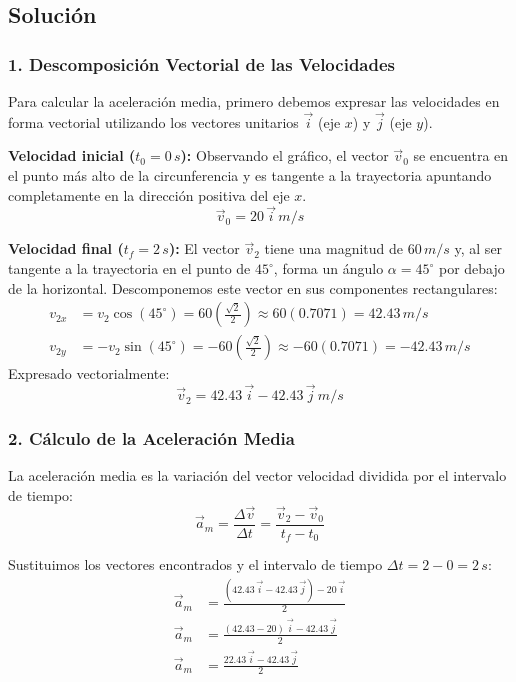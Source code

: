 \documentclass[12pt, a4paper]{article}
\begin{document}
\subsection*{Solución}

\subsubsection*{1. Descomposición Vectorial de las Velocidades}
Para calcular la aceleración media, primero debemos expresar las velocidades en forma vectorial utilizando los vectores unitarios $\vec{i}$ (eje $x$) y $\vec{j}$ (eje $y$).

\textbf{Velocidad inicial ($t_0 = 0 \, \si{s}$):}
Observando el gráfico, el vector $\vec{v}_0$ se encuentra en el punto más alto de la circunferencia y es tangente a la trayectoria apuntando completamente en la dirección positiva del eje $x$.
$$\vec{v}_0 = 20 \, \vec{i} \, \si{m/s}$$

\textbf{Velocidad final ($t_f = 2 \, \si{s}$):}
El vector $\vec{v}_2$ tiene una magnitud de $60 \, \si{m/s}$ y, al ser tangente a la trayectoria en el punto de $45^\circ$, forma un ángulo $\alpha = 45^\circ$ por debajo de la horizontal. Descomponemos este vector en sus componentes rectangulares:
\begin{align*}
    v_{2x} &= v_2 \cos(45^\circ) = 60 \left(\frac{\sqrt{2}}{2}\right) \approx 60 (0.7071) = 42.43 \, \si{m/s} \\
    v_{2y} &= -v_2 \sin(45^\circ) = -60 \left(\frac{\sqrt{2}}{2}\right) \approx -60 (0.7071) = -42.43 \, \si{m/s}
\end{align*}
Expresado vectorialmente:
$$\vec{v}_2 = 42.43 \, \vec{i} - 42.43 \, \vec{j} \, \si{m/s}$$

\subsubsection*{2. Cálculo de la Aceleración Media}
La aceleración media es la variación del vector velocidad dividida por el intervalo de tiempo:
$$\vec{a}_m = \frac{\Delta \vec{v}}{\Delta t} = \frac{\vec{v}_2 - \vec{v}_0}{t_f - t_0}$$

Sustituimos los vectores encontrados y el intervalo de tiempo $\Delta t = 2 - 0 = 2 \, \si{s}$:
\begin{align*}
    \vec{a}_m &= \frac{(42.43 \, \vec{i} - 42.43 \, \vec{j}) - 20 \, \vec{i}}{2} \\
    \vec{a}_m &= \frac{(42.43 - 20) \, \vec{i} - 42.43 \, \vec{j}}{2} \\
    \vec{a}_m &= \frac{22.43 \, \vec{i} - 42.43 \, \vec{j}}{2}
\end{align*}
\end{document}
